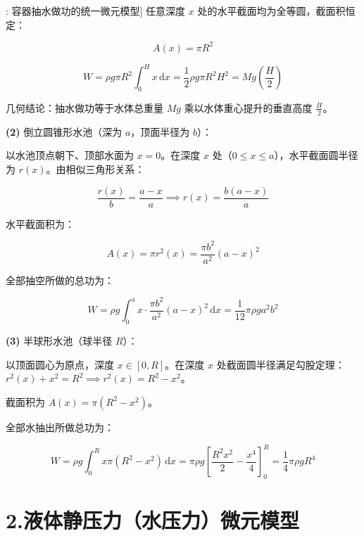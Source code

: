 \documentclass[11pt,a4paper,UTF8]{ctexart}
\begin{document}
\begin{thmbox}[模型[1]: 容器抽水做功的统一微元模型]
任意深度 $x$ 处的水平截面均为全等圆，截面积恒定：


\begin{equation*}
A(x) = \pi R^2
\end{equation*}



\begin{equation*}
W = \rho g \pi R^2 \int_0^H x\,\mathrm{d}x = \frac{1}{2}\rho g \pi R^2 H^2 = M g \left(\frac{H}{2}\right)
\end{equation*}


几何结论：抽水做功等于水体总重量 $M g$ 乘以水体重心提升的垂直高度 $\frac{H}{2}$。

\textbf{(2)}  \textit{}倒立圆锥形水池（深为 $a$，顶面半径为 $b$）\textit{}：

以水池顶点朝下、顶部水面为 $x = 0$。在深度 $x$ 处（$0 \leqslant x \leqslant a$），水平截面圆半径为 $r(x)$。由相似三角形关系：


\begin{equation*}
\frac{r(x)}{b} = \frac{a - x}{a} \implies r(x) = \frac{b(a - x)}{a}
\end{equation*}


水平截面积为：


\begin{equation*}
A(x) = \pi r^2(x) = \frac{\pi b^2}{a^2}(a - x)^2
\end{equation*}


全部抽空所做的总功为：


\begin{equation*}
W = \rho g \int_0^a x \cdot \frac{\pi b^2}{a^2}(a - x)^2\,\mathrm{d}x = \frac{1}{12}\pi \rho g a^2 b^2
\end{equation*}


\textbf{(3)}  \textit{}半球形水池（球半径 $R$）\textit{}：

以顶面圆心为原点，深度 $x \in [0, R]$。在深度 $x$ 处截面圆半径满足勾股定理：$r^2(x) + x^2 = R^2 \implies r^2(x) = R^2 - x^2$。

截面积为 $A(x) = \pi(R^2 - x^2)$。

全部水抽出所做总功为：


\begin{equation*}
W = \rho g \int_0^R x \pi (R^2 - x^2)\,\mathrm{d}x = \pi \rho g \left[\frac{R^2 x^2}{2} - \frac{x^4}{4}\right]_0^R = \frac{1}{4}\pi \rho g R^4
\end{equation*}


\end{thmbox}

\section{2.液体静压力（水压力）微元模型}
\end{document}
